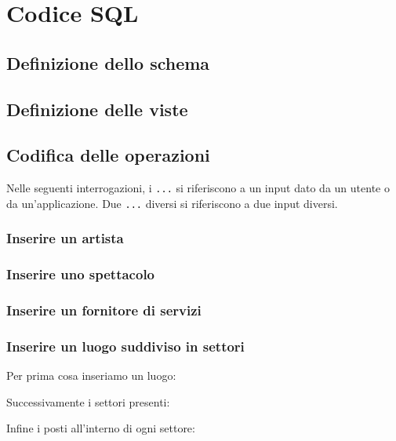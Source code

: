 \documentclass[a4paper,11pt]{article}
\begin{document}
\section{Codice SQL}

\subsection{Definizione dello schema}


\vspace*{1em}

\subsection{Definizione delle viste}


\vspace*{1em}

\subsection{Codifica delle operazioni}
Nelle seguenti interrogazioni, i \texttt{...} si riferiscono a un input dato da un utente o da un'applicazione.
Due \texttt{...} diversi si riferiscono a due input diversi.

\subsubsection{Inserire un artista}


\subsubsection{Inserire uno spettacolo}


\subsubsection{Inserire un fornitore di servizi}


\subsubsection{Inserire un luogo suddiviso in settori}

Per prima cosa inseriamo un luogo:

Successivamente i settori presenti:

Infine i posti all'interno di ogni settore:

\end{document}
